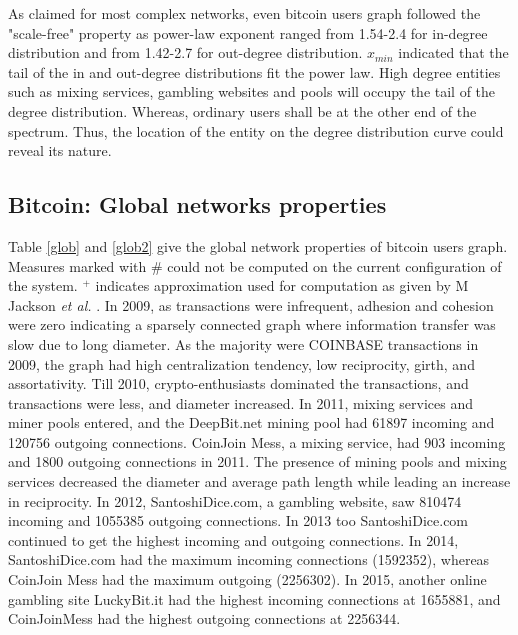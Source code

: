\documentclass[preprint,12pt]{elsarticle}
\begin{document}
As claimed for most complex networks, even bitcoin users graph followed the "scale-free" property as power-law exponent ranged from 1.54-2.4 for in-degree distribution and from 1.42-2.7 for out-degree distribution. $x_{min}$ indicated that the tail of the in and out-degree distributions fit the power law. High degree entities such as mixing services, gambling websites and pools will occupy the tail of the degree distribution. Whereas, ordinary users shall be at the other end of the spectrum. Thus, the location of the entity on the degree distribution curve could reveal its nature. 




\subsection{Bitcoin: Global networks properties}
Table \ref{glob} and \ref{glob2} give the global network properties of bitcoin users graph. Measures marked with \# could not be computed on the current configuration of the system. $^{+}$ indicates approximation used for computation as given by M Jackson \textit{et al.} \cite{jackson2010social}. In 2009, as transactions were infrequent, adhesion and cohesion were zero indicating a sparsely connected graph where information transfer was slow due to long diameter. As the majority were COINBASE transactions in 2009, the graph had high centralization tendency, low reciprocity, girth, and assortativity. Till 2010, crypto-enthusiasts dominated the transactions, and transactions were less, and diameter increased. In 2011, mixing services and miner pools entered, and the DeepBit.net mining pool had 61897 incoming and 120756 outgoing connections. CoinJoin Mess, a mixing service, had 903 incoming and 1800 outgoing connections in 2011. The presence of mining pools and mixing services decreased the diameter and average path length while leading an increase in reciprocity. In 2012, SantoshiDice.com, a gambling website, saw 810474 incoming and 1055385 outgoing connections. In 2013 too SantoshiDice.com continued to get the highest incoming and outgoing connections. In 2014, SantoshiDice.com had the maximum incoming connections (1592352), whereas CoinJoin Mess had the maximum outgoing (2256302). In 2015, another online gambling site LuckyBit.it had the highest incoming connections at 1655881, and CoinJoinMess had the highest outgoing connections at 2256344. 
\end{document}

